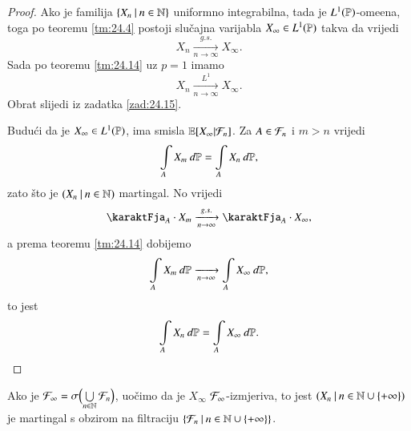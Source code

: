 \begin{proof}
    Ako je familija $\{{X_n} \: | \: {n \in \mathbb{N}}\}$ uniformno integrabilna, tada je $L^1 (\mathbb{P})$-ome\dj ena, toga po teoremu \ref{tm:24.4} postoji slu\v cajna varijabla $X_\infty \in L^1 (\mathbb{P})$ takva da vrijedi
    \begin{equation*}
        X_n \xrightarrow[n \to \infty]{g.s.} X_\infty.
    \end{equation*}
    Sada po teoremu \ref{tm:24.14} uz $p = 1$ imamo
    \begin{equation*}
        X_n \xrightarrow[n \to \infty]{L^1} X_\infty.
    \end{equation*}
    Obrat slijedi iz zadatka \ref{zad:24.15}.

    Budu\' ci da je $X_\infty \in L^1 (\mathbb{P})$, ima smisla $\mathbb{E} [X_\infty | \mathcal{F}_n]$.
    Za $A \in \mathcal{F}_n$ i $m > n$ vrijedi
    \begin{equation*}
        \int\limits_A X_m \: d \mathbb{P} = \int\limits_A X_n \: d \mathbb{P},
    \end{equation*}
    zato \v sto je $({X_n} \: | \: {n \in \mathbb{N}})$ martingal.
    No vrijedi
    \begin{equation*}
        \karaktFja_A \cdot X_m \xrightarrow[n \to \infty]{g.s.} \karaktFja_A \cdot X_\infty,
    \end{equation*}
    a prema teoremu \ref{tm:24.14} dobijemo
    \begin{equation*}
        \int\limits_A X_m \: d \mathbb{P} \xrightarrow[n \to \infty]{} \int\limits_A X_\infty \: d \mathbb{P},
    \end{equation*}
    to jest
    \begin{equation*}
        \int\limits_A X_n \: d \mathbb{P} = \int\limits_A X_\infty \: d \mathbb{P}.
    \end{equation*}
\end{proof}

\begin{nap} \label{nap:24.18}
    Ako je $\mathcal{F}_\infty = \sigma \Big( {\bigcup\limits_{n \in \mathbb{N}}^{} \mathcal{F}_n} \Big)$, uo\v cimo da je $X_\infty$ $\mathcal{F}_\infty$-izmjeriva, to jest
    $({X_n} \: | \: {n \in \mathbb{N} \cup \{+ \infty\}})$ je martingal s obzirom na filtraciju $\{{\mathcal{F}_n} \: | \: {n \in \mathbb{N} \cup \{+ \infty\}}\}$.
\end{nap}